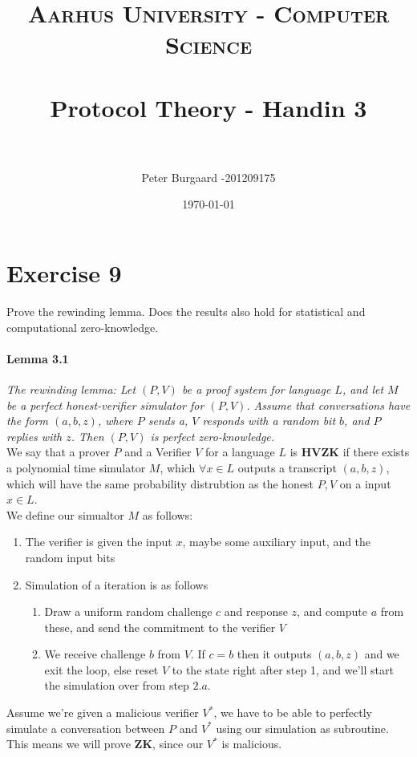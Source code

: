 \documentclass[paper=a4, fontsize=11pt]{scrartcl} %
\title{	
	\normalfont \normalsize 
	\textsc{Aarhus University - Computer Science} \\ [25pt] %
	\horrule{0.5pt} \\[0.4cm] %
	\huge Protocol Theory - Handin 3 \\ %
	\horrule{2pt} \\[0.5cm] %
}
\author{Peter Burgaard -201209175} %
\date{\normalsize\today} %
\numberwithin{equation}{section} %
\numberwithin{figure}{section} %
\numberwithin{table}{section} %
\begin{document}
	
	\maketitle %
	
	\section*{Exercise 9}
    
    Prove the rewinding lemma. Does the results also hold for statistical and computational zero-knowledge.
    
    \paragraph{Lemma 3.1} \textit{The rewinding lemma: Let $(P,V)$ be a proof system for language $L$, and let $M$ be a perfect honest-verifier simulator for $(P,V)$. Assume that conversations have the form $(a,b,z)$, where $P$ sends a, $V$ responds with a random bit $b$, and $P$ replies with $z$. Then $(P,V)$ is perfect zero-knowledge.} \\
	

	We say that a prover $P$ and a Verifier $V$ for a language $L$ is \textbf{HVZK} if  there exists a polynomial time simulator $M$, which $\forall x\in L$ outputs a transcript $(a,b,z)$, which will have the same probability distrubtion as the honest $P, V$ on a input $x\in L$.  \\
	
	We define our simualtor $M$ as follows:
	\begin{enumerate}
		\item The verifier is given the input $x$, maybe some auxiliary input, and the random input bits
		\item Simulation of a iteration is as follows
		\begin{enumerate}
			\item Draw a uniform random challenge $c$ and response $z$, and compute $a$ from these, and send the commitment to the verifier $V$
			\item We receive challenge $b$ from $V$. If $c=b$ then it outputs $(a,b,z)$ and we exit the loop, else reset $V$ to the state right after step 1, and we'll start the simulation over from step $2.a$.
		\end{enumerate}
	\end{enumerate} 
	
	Assume we're given a malicious verifier $V^*$, we have to be able to perfectly simulate a conversation between $P$ and $V^*$ using our simulation as subroutine. This means we will prove \textbf{ZK}, since our $V^*$ is malicious. \\
	
\end{document}
